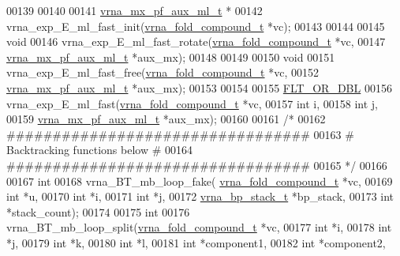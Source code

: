 \begin{DoxyCode}
00139 
00140 
00141 \hyperlink{group__loops_structvrna__mx__pf__aux__ml__t}{vrna\_mx\_pf\_aux\_ml\_t} *
00142 vrna\_exp\_E\_ml\_fast\_init(\hyperlink{group__fold__compound_structvrna__fc__s}{vrna\_fold\_compound\_t} *vc);
00143 
00144 
00145 \textcolor{keywordtype}{void}
00146 vrna\_exp\_E\_ml\_fast\_rotate(\hyperlink{group__fold__compound_structvrna__fc__s}{vrna\_fold\_compound\_t}  *vc,
00147                           \hyperlink{group__loops_structvrna__mx__pf__aux__ml__t}{vrna\_mx\_pf\_aux\_ml\_t}   *aux\_mx);
00148 
00149 
00150 \textcolor{keywordtype}{void}
00151 vrna\_exp\_E\_ml\_fast\_free(\hyperlink{group__fold__compound_structvrna__fc__s}{vrna\_fold\_compound\_t}  *vc,
00152                           \hyperlink{group__loops_structvrna__mx__pf__aux__ml__t}{vrna\_mx\_pf\_aux\_ml\_t} *aux\_mx);
00153 
00154 
00155 \hyperlink{group__data__structures_ga31125aeace516926bf7f251f759b6126}{FLT\_OR\_DBL}
00156 vrna\_exp\_E\_ml\_fast(\hyperlink{group__fold__compound_structvrna__fc__s}{vrna\_fold\_compound\_t} *vc,
00157                    \textcolor{keywordtype}{int}                  i,
00158                    \textcolor{keywordtype}{int}                  j,
00159                    \hyperlink{group__loops_structvrna__mx__pf__aux__ml__t}{vrna\_mx\_pf\_aux\_ml\_t}  *aux\_mx);
00160 
00161 \textcolor{comment}{/*}
00162 \textcolor{comment}{#################################}
00163 \textcolor{comment}{# Backtracking functions below  #}
00164 \textcolor{comment}{#################################}
00165 \textcolor{comment}{*/}
00166 
00167 \textcolor{keywordtype}{int}
00168 vrna\_BT\_mb\_loop\_fake( \hyperlink{group__fold__compound_structvrna__fc__s}{vrna\_fold\_compound\_t} *vc,
00169                       \textcolor{keywordtype}{int} *u,
00170                       \textcolor{keywordtype}{int} *i,
00171                       \textcolor{keywordtype}{int} *j,
00172                       \hyperlink{group__data__structures_structvrna__bp__stack__s}{vrna\_bp\_stack\_t} *bp\_stack,
00173                       \textcolor{keywordtype}{int} *stack\_count);
00174 
00175 \textcolor{keywordtype}{int}
00176 vrna\_BT\_mb\_loop\_split(\hyperlink{group__fold__compound_structvrna__fc__s}{vrna\_fold\_compound\_t} *vc,
00177                       \textcolor{keywordtype}{int} *i,
00178                       \textcolor{keywordtype}{int} *j,
00179                       \textcolor{keywordtype}{int} *k,
00180                       \textcolor{keywordtype}{int} *l,
00181                       \textcolor{keywordtype}{int} *component1,
00182                       \textcolor{keywordtype}{int} *component2,

\end{DoxyCode}
